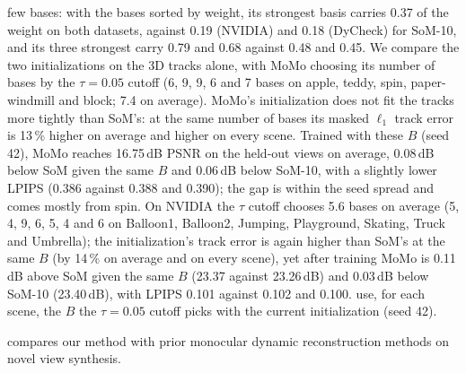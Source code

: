 few bases: with the bases sorted by weight, its strongest basis carries 0.37 of the weight on both datasets, against 0.19 (NVIDIA) and
0.18 (DyCheck) for SoM-10, and its three strongest carry 0.79 and 0.68 against 0.48 and 0.45.
We compare the two initializations on the 3D tracks alone, %
 with MoMo choosing its number of bases by the
$\tau = 0.05$ cutoff (6, 9, 9, 6 and 7 bases on apple, teddy, spin, paper-windmill and block; 7.4 on average). MoMo's initialization does
not fit the tracks more tightly than SoM's: at the same number of bases its masked $\ell_1$ track error is 13\,\% higher on
average and higher on every scene. Trained with these $B$ (seed 42), MoMo reaches 16.75\,dB PSNR on the held-out views on average, 0.08\,dB below SoM
given the same $B$ and 0.06\,dB below SoM-10, with a slightly lower LPIPS (0.386 against 0.388 and 0.390); the gap is
within the seed spread and comes mostly from spin. On NVIDIA the $\tau$ cutoff chooses 5.6 bases on average (5, 4, 9, 6, 5, 4 and 6 on
Balloon1, Balloon2, Jumping, Playground, Skating, Truck and Umbrella); the initialization's track error is again higher than
SoM's at the same $B$ (by 14\,\% on average and on every scene), yet after training MoMo is 0.11\,dB above SoM given the same
$B$ (23.37 against 23.26\,dB) and 0.03\,dB below SoM-10 (23.40\,dB), with LPIPS 0.101 against 0.102 and 0.100.
 use, for each scene, the $B$ the $\tau = 0.05$ cutoff picks with the current initialization (seed 42).


 compares our method with prior monocular dynamic reconstruction methods on novel view synthesis.

